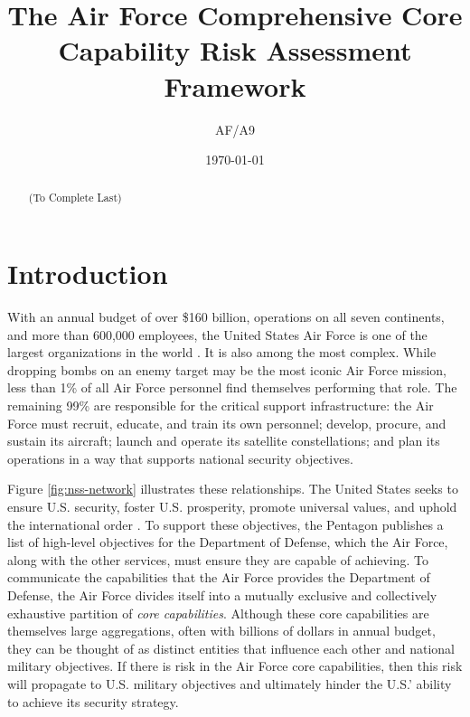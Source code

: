 \documentclass{article}
\author{AF/A9}
\title{The Air Force Comprehensive Core Capability Risk Assessment Framework}
\date{\today}
\begin{document}
\maketitle

\begin{abstract}
(To Complete Last)
\end{abstract}

\section{Introduction}
With an annual budget of over \$160 billion, operations on all seven continents, and more than 600,000 employees, the United States Air Force is one of the largest organizations in the world \citep{afbudget}. It is also among the most complex. While dropping bombs on an enemy target may be the most iconic Air Force mission, less than 1\% of all Air Force personnel find themselves performing that role. The remaining 99\% are responsible for the critical support infrastructure: the Air Force must recruit, educate, and train its own personnel; develop, procure, and sustain its aircraft; launch and operate its satellite constellations; and plan its operations in a way that supports national security objectives.

Figure \ref{fig:nss-network} illustrates these relationships. The United States seeks to ensure U.S. security, foster U.S. prosperity, promote universal values, and uphold the international order \citep{nss}. To support these objectives, the Pentagon publishes a list of high-level objectives for the Department of Defense, which the Air Force, along with the other services, must ensure they are capable of achieving. To communicate the capabilities that the Air Force provides the Department of Defense, the Air Force divides itself into a mutually exclusive and collectively exhaustive partition of \emph{core capabilities}. Although these core capabilities are themselves large aggregations, often with billions of dollars in annual budget, they can be thought of as distinct entities that influence each other and national military objectives. If there is risk in the Air Force core capabilities, then this risk will propagate to U.S. military objectives and ultimately hinder the U.S.' ability to achieve its security strategy.
\end{document}
